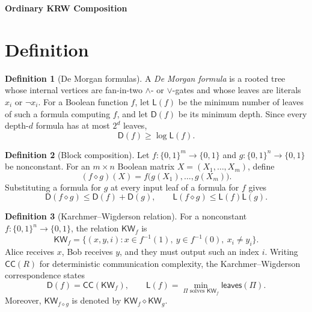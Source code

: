 \documentclass[10pt,a4paper]{article}
\theoremstyle{definition}
\newtheorem{definition}{Definition}
\theoremstyle{plain}
\theoremstyle{definition}
\newcommand{\KW}{\mathsf{KW}}
\newcommand{\CC}{\mathsf{CC}}
\newcommand{\Depth}{\mathsf{D}}
\newcommand{\Size}{\mathsf{L}}
\newcommand{\Leaves}{\mathsf{leaves}}
\begin{document}
\begin{center}
  {\Large\bfseries Ordinary KRW Composition}
\end{center}
\section{Definition}
\begin{definition}[De Morgan formulas]
A \emph{De Morgan formula} is a rooted tree whose internal vertices are fan-in-two
$\wedge$- or $\vee$-gates and whose leaves are literals $x_i$ or $\neg x_i$.
For a Boolean function $f$, let $\Size(f)$ be the minimum number of leaves of such a
formula computing $f$, and let $\Depth(f)$ be its minimum depth. Since every depth-$d$
formula has at most $2^d$ leaves,
\begin{equation}\label{eq:size-depth}
  \Depth(f)\geq \log \Size(f).
\end{equation}
\end{definition}

\begin{definition}[Block composition]
Let $f:\{0,1\}^{m}\to\{0,1\}$ and $g:\{0,1\}^{n}\to\{0,1\}$ be nonconstant.
For an $m\times n$ Boolean matrix $X=(X_1,\ldots,X_m)$, define
\begin{equation}\label{eq:composition}
  (f\diamond g)(X)=f\bigl(g(X_1),\ldots,g(X_m)\bigr).
\end{equation}
Substituting a formula for $g$ at every input leaf of a formula for $f$ gives
\begin{equation}\label{eq:easy-upper}
  \Depth(f\diamond g)\leq \Depth(f)+\Depth(g),
  \qquad
  \Size(f\diamond g)\leq \Size(f)\Size(g).
\end{equation}
\end{definition}

\begin{definition}[Karchmer--Wigderson relation]
For a nonconstant $f:\{0,1\}^{n}\to\{0,1\}$, the relation $\KW_f$ is
\begin{equation}\label{eq:kw-relation}
  \KW_f=\{(x,y,i):x\in f^{-1}(1),\ y\in f^{-1}(0),\ x_i\neq y_i\}.
\end{equation}
Alice receives $x$, Bob receives $y$, and they must output such an index $i$.
Writing $\CC(R)$ for deterministic communication complexity, the
Karchmer--Wigderson correspondence states
\begin{equation}\label{eq:kw-correspondence}
  \Depth(f)=\CC(\KW_f),
  \qquad
  \Size(f)=\min_{\Pi\text{ solves }\KW_f}\Leaves(\Pi).
\end{equation}
Moreover, $\KW_{f\diamond g}$ is denoted by $\KW_f\diamond\KW_g$.
\end{definition}
\end{document}
